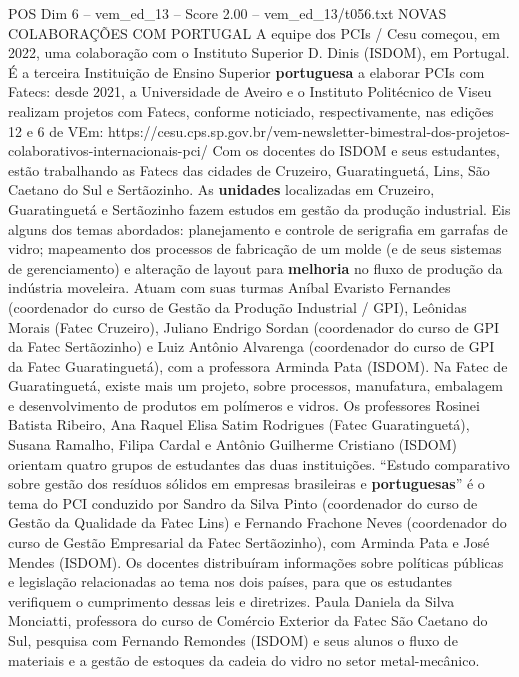 \begin{textsample}{POS Dim 6 – vem\_ed\_13 – Score 2.00 – vem\_ed\_13/t056.txt}  \label{ex:f6_pos_119}
NOVAS COLABORAÇÕES COM PORTUGAL A equipe dos PCIs / Cesu começou, em 2022, uma colaboração com o Instituto Superior D.
Dinis (ISDOM), em Portugal.
É a terceira Instituição de Ensino Superior \textbf{portuguesa} a elaborar PCIs com Fatecs: desde 2021, a Universidade de Aveiro e o Instituto Politécnico de Viseu realizam projetos com Fatecs, conforme noticiado, respectivamente, nas edições 12 e 6 de VEm: https://cesu.cps.sp.gov.br/vem-newsletter-bimestral-dos-projetos-colaborativos-internacionais-pci/ Com os docentes do ISDOM e seus estudantes, estão trabalhando as Fatecs das cidades de Cruzeiro, Guaratinguetá, Lins, São Caetano do Sul e Sertãozinho.
As \textbf{unidades} localizadas em Cruzeiro, Guaratinguetá e Sertãozinho fazem estudos em gestão da produção industrial.
Eis alguns dos temas abordados: planejamento e controle de serigrafia em garrafas de vidro; mapeamento dos processos de fabricação de um molde (e de seus sistemas de gerenciamento) e alteração de layout para \textbf{melhoria} no fluxo de produção da indústria moveleira.
Atuam com suas turmas Aníbal Evaristo Fernandes (coordenador do curso de Gestão da Produção Industrial / GPI), Leônidas Morais (Fatec Cruzeiro), Juliano Endrigo Sordan (coordenador do curso de GPI da Fatec Sertãozinho) e Luiz Antônio Alvarenga (coordenador do curso de GPI da Fatec Guaratinguetá), com a professora Arminda Pata (ISDOM).
Na Fatec de Guaratinguetá, existe mais um projeto, sobre processos, manufatura, embalagem e desenvolvimento de produtos em polímeros e vidros.
Os professores Rosinei Batista Ribeiro, Ana Raquel Elisa Satim Rodrigues (Fatec Guaratinguetá), Susana Ramalho, Filipa Cardal e Antônio Guilherme Cristiano (ISDOM) orientam quatro grupos de estudantes das duas instituições. “Estudo comparativo sobre gestão dos resíduos sólidos em empresas brasileiras e \textbf{portuguesas}” é o tema do PCI conduzido por Sandro da Silva Pinto (coordenador do curso de Gestão da Qualidade da Fatec Lins) e Fernando Frachone Neves (coordenador do curso de Gestão Empresarial da Fatec Sertãozinho), com Arminda Pata e José Mendes (ISDOM).
Os docentes distribuíram informações sobre políticas públicas e legislação relacionadas ao tema nos dois países, para que os estudantes verifiquem o cumprimento dessas leis e diretrizes.
Paula Daniela da Silva Monciatti, professora do curso de Comércio Exterior da Fatec São Caetano do Sul, pesquisa com Fernando Remondes (ISDOM) e seus alunos o fluxo de materiais e a gestão de estoques da cadeia do vidro no setor metal-mecânico.

\end{textsample}
